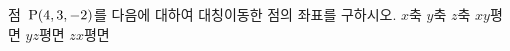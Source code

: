 점~$\mathrm{P}(4{,}\mkern3mu\mathopen{}3{,}\mkern3mu\mathopen{}-2)$를 다음에 대하여 대칭이동한 점의 좌표를 구하시오.
 $x$축
 $y$축
 $z$축
 $xy$평면
 $yz$평면
 $zx$평면
